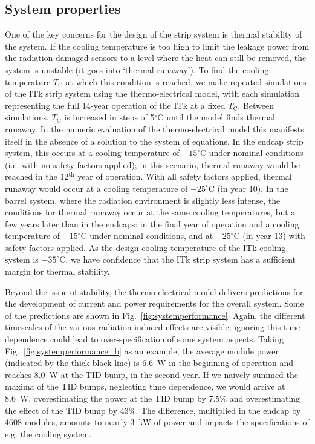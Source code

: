 \subsection{System properties}\label{sec:systemprop}
One of the key concerns for the design of the strip system is thermal stability of the system. If the cooling temperature is too high to limit the leakage power from the radiation-damaged sensors to a level where the heat can still be removed, the system is unstable (it goes into `thermal runaway').
To find the cooling temperature $T_\text{C}$ at which this condition is reached, we make repeated simulations of the ITk strip system using the thermo-electrical model, with each simulation representing the full 14-year operation of the ITk at a fixed $T_\text{C}$. Between simulations, $T_\text{C}$ is increased in steps of 5$^\circ$C until the model finds thermal runaway. In the numeric evaluation of the thermo-electrical model this manifests itself in the absence of a solution to the system of equations. In the endcap strip system, this occurs at a cooling temperature of $-15^\circ$C under nominal conditions (i.e. with no safety factors applied); in this scenario, thermal runaway would be reached in the 12$^\text{th}$ year of operation. With all safety factors applied, thermal runaway would occur at a cooling temperature of $-25^\circ$C (in year 10).
In the barrel system, where the radiation environment is slightly less intense, the conditions for thermal runaway occur at the same cooling temperatures, but a few years later than in the endcaps: in the final year of operation and a cooling temperature of $-15^\circ$C under nominal conditions, and at $-25^\circ$C (in year 13) with safety factors applied.
As the design cooling temperature of the ITk cooling system is $-35^\circ$C, we have confidence that the ITk strip system has a sufficient margin for thermal stability.

Beyond the issue of stability, the thermo-electrical model delivers predictions for the development of current and power requirements for the overall system. Some of the predictions are shown in Fig.~\ref{fig:systemperformance}. Again, the different timescales of the various radiation-induced effects are visible; ignoring this time dependence could lead to over-specification of some system aspects.
Taking Fig.~\ref{fig:systemperformance_b} as an example, the average module power (indicated by the thick black line) is 6.6~W in the beginning of operation and reaches 8.0~W at the TID bump, in the second year. If we naively summed the maxima of the TID bumps, neglecting time dependence, we would arrive at 8.6~W, overestimating the power at the TID bump by 7.5\% and overestimating the effect of the TID bump by 43\%.
The difference, multiplied in the endcap by 4608 modules, amounts to nearly 3~kW of power and impacts the specifications of e.g. the cooling system.

